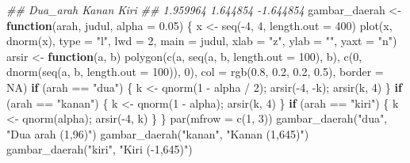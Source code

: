 \documentclass[
  indonesian,
  letterpaper,
]{book}
\newenvironment{Shaded}{\begin{snugshade}}{\end{snugshade}}
\newcommand{\AttributeTok}[1]{\textcolor[rgb]{0.40,0.45,0.13}{#1}}
\newcommand{\ConstantTok}[1]{\textcolor[rgb]{0.56,0.35,0.01}{#1}}
\newcommand{\ControlFlowTok}[1]{\textcolor[rgb]{0.00,0.23,0.31}{\textbf{#1}}}
\newcommand{\DecValTok}[1]{\textcolor[rgb]{0.68,0.00,0.00}{#1}}
\newcommand{\DocumentationTok}[1]{\textcolor[rgb]{0.37,0.37,0.37}{\textit{#1}}}
\newcommand{\FloatTok}[1]{\textcolor[rgb]{0.68,0.00,0.00}{#1}}
\newcommand{\FunctionTok}[1]{\textcolor[rgb]{0.28,0.35,0.67}{#1}}
\newcommand{\NormalTok}[1]{\textcolor[rgb]{0.00,0.23,0.31}{#1}}
\newcommand{\OtherTok}[1]{\textcolor[rgb]{0.00,0.23,0.31}{#1}}
\newcommand{\SpecialCharTok}[1]{\textcolor[rgb]{0.37,0.37,0.37}{#1}}
\newcommand{\StringTok}[1]{\textcolor[rgb]{0.13,0.47,0.30}{#1}}
\begin{document}
\begin{Shaded}
\begin{Highlighting}[]
\DocumentationTok{\#\# Dua\_arah Kanan Kiri}
\DocumentationTok{\#\# 1.959964 1.644854 {-}1.644854}
\NormalTok{gambar\_daerah }\OtherTok{\textless{}{-}} \ControlFlowTok{function}\NormalTok{(arah, judul, }\AttributeTok{alpha =} \FloatTok{0.05}\NormalTok{) \{}
\NormalTok{x }\OtherTok{\textless{}{-}} \FunctionTok{seq}\NormalTok{(}\SpecialCharTok{{-}}\DecValTok{4}\NormalTok{, }\DecValTok{4}\NormalTok{, }\AttributeTok{length.out =} \DecValTok{400}\NormalTok{)}
\FunctionTok{plot}\NormalTok{(x, }\FunctionTok{dnorm}\NormalTok{(x), }\AttributeTok{type =} \StringTok{"l"}\NormalTok{, }\AttributeTok{lwd =} \DecValTok{2}\NormalTok{, }\AttributeTok{main =}\NormalTok{ judul, }\AttributeTok{xlab =} \StringTok{"z"}\NormalTok{, }\AttributeTok{ylab =} \StringTok{""}\NormalTok{, yaxt}
\OtherTok{=} \StringTok{"n"}\NormalTok{)}
\NormalTok{arsir }\OtherTok{\textless{}{-}} \ControlFlowTok{function}\NormalTok{(a, b) }\FunctionTok{polygon}\NormalTok{(}\FunctionTok{c}\NormalTok{(a, }\FunctionTok{seq}\NormalTok{(a, b, }\AttributeTok{length.out =} \DecValTok{100}\NormalTok{), b),}
\FunctionTok{c}\NormalTok{(}\DecValTok{0}\NormalTok{, }\FunctionTok{dnorm}\NormalTok{(}\FunctionTok{seq}\NormalTok{(a, b, }\AttributeTok{length.out =} \DecValTok{100}\NormalTok{)), }\DecValTok{0}\NormalTok{),}
\AttributeTok{col =} \FunctionTok{rgb}\NormalTok{(}\FloatTok{0.8}\NormalTok{, }\FloatTok{0.2}\NormalTok{, }\FloatTok{0.2}\NormalTok{, }\FloatTok{0.5}\NormalTok{), }\AttributeTok{border =} \ConstantTok{NA}\NormalTok{)}
\ControlFlowTok{if}\NormalTok{ (arah }\SpecialCharTok{==} \StringTok{"dua"}\NormalTok{) \{ k }\OtherTok{\textless{}{-}} \FunctionTok{qnorm}\NormalTok{(}\DecValTok{1} \SpecialCharTok{{-}}\NormalTok{ alpha }\SpecialCharTok{/} \DecValTok{2}\NormalTok{); }\FunctionTok{arsir}\NormalTok{(}\SpecialCharTok{{-}}\DecValTok{4}\NormalTok{, }\SpecialCharTok{{-}}\NormalTok{k); }\FunctionTok{arsir}\NormalTok{(k, }\DecValTok{4}\NormalTok{) \}}
\ControlFlowTok{if}\NormalTok{ (arah }\SpecialCharTok{==} \StringTok{"kanan"}\NormalTok{) \{ k }\OtherTok{\textless{}{-}} \FunctionTok{qnorm}\NormalTok{(}\DecValTok{1} \SpecialCharTok{{-}}\NormalTok{ alpha); }\FunctionTok{arsir}\NormalTok{(k, }\DecValTok{4}\NormalTok{) \}}
\ControlFlowTok{if}\NormalTok{ (arah }\SpecialCharTok{==} \StringTok{"kiri"}\NormalTok{) \{ k }\OtherTok{\textless{}{-}} \FunctionTok{qnorm}\NormalTok{(alpha); }\FunctionTok{arsir}\NormalTok{(}\SpecialCharTok{{-}}\DecValTok{4}\NormalTok{, k) \}}
\NormalTok{\}}
\FunctionTok{par}\NormalTok{(}\AttributeTok{mfrow =} \FunctionTok{c}\NormalTok{(}\DecValTok{1}\NormalTok{, }\DecValTok{3}\NormalTok{))}
\FunctionTok{gambar\_daerah}\NormalTok{(}\StringTok{"dua"}\NormalTok{, }\StringTok{"Dua arah (1,96)"}\NormalTok{)}
\FunctionTok{gambar\_daerah}\NormalTok{(}\StringTok{"kanan"}\NormalTok{, }\StringTok{"Kanan (1,645)"}\NormalTok{)}
\FunctionTok{gambar\_daerah}\NormalTok{(}\StringTok{"kiri"}\NormalTok{, }\StringTok{"Kiri ({-}1,645)"}\NormalTok{)}
\end{Highlighting}
\end{Shaded}
\end{document}
